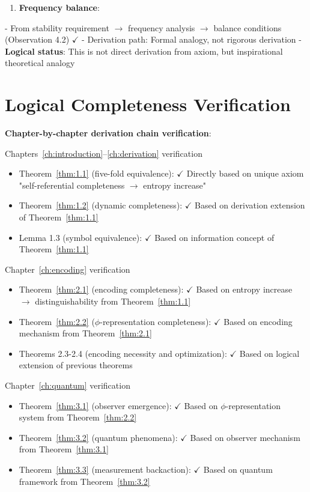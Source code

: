 \begin{enumerate}
\item \textbf{Frequency balance}:
\end{enumerate}
   - From stability requirement $\rightarrow$ frequency analysis $\rightarrow$ balance conditions (Observation 4.2) $\checkmark$
   - Derivation path: Formal analogy, not rigorous derivation
   - \textbf{Logical status}: This is not direct derivation from axiom, but inspirational theoretical analogy

\section{Logical Completeness Verification}
\label{sec:ch10_completeness:logical-completeness-verification}

\textbf{Chapter-by-chapter derivation chain verification}:

Chapters~\ref{ch:introduction}--\ref{ch:derivation} verification
\begin{itemize}
\item Theorem~\ref{thm:1.1} (five-fold equivalence): $\checkmark$ Directly based on unique axiom "self-referential completeness $\rightarrow$ entropy increase"
\item Theorem~\ref{thm:1.2} (dynamic completeness): $\checkmark$ Based on derivation extension of Theorem~\ref{thm:1.1}
\item Lemma 1.3 (symbol equivalence): $\checkmark$ Based on information concept of Theorem~\ref{thm:1.1}
\end{itemize}

Chapter~\ref{ch:encoding} verification
\begin{itemize}
\item Theorem~\ref{thm:2.1} (encoding completeness): $\checkmark$ Based on entropy increase $\rightarrow$ distinguishability from Theorem~\ref{thm:1.1}
\item Theorem~\ref{thm:2.2} ($\phi$-representation completeness): $\checkmark$ Based on encoding mechanism from Theorem~\ref{thm:2.1}
\item Theorems 2.3-2.4 (encoding necessity and optimization): $\checkmark$ Based on logical extension of previous theorems
\end{itemize}

Chapter~\ref{ch:quantum} verification
\begin{itemize}
\item Theorem~\ref{thm:3.1} (observer emergence): $\checkmark$ Based on $\phi$-representation system from Theorem~\ref{thm:2.2}
\item Theorem~\ref{thm:3.2} (quantum phenomena): $\checkmark$ Based on observer mechanism from Theorem~\ref{thm:3.1}
\item Theorem~\ref{thm:3.3} (measurement backaction): $\checkmark$ Based on quantum framework from Theorem~\ref{thm:3.2}
\end{itemize}

